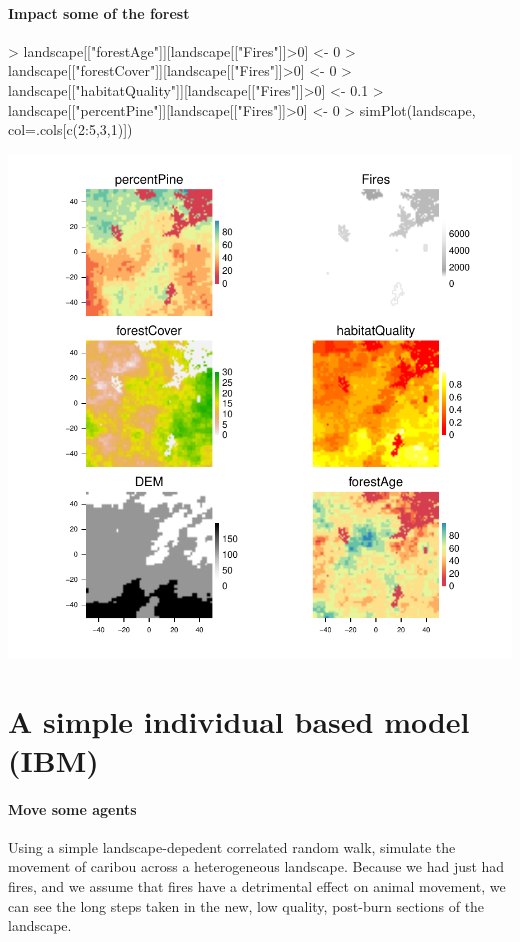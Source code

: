 \documentclass{article}
\begin{document}
\paragraph{Impact some of the forest}
\begin{Schunk}
\begin{Sinput}
> landscape[["forestAge"]][landscape[["Fires"]]>0] <- 0
> landscape[["forestCover"]][landscape[["Fires"]]>0] <- 0
> landscape[["habitatQuality"]][landscape[["Fires"]]>0] <- 0.1
> landscape[["percentPine"]][landscape[["Fires"]]>0] <- 0
> simPlot(landscape, col=.cols[c(2:5,3,1)])
\end{Sinput}
\end{Schunk}
\includegraphics{introduction-fire-impacts-maps}

\section{A simple individual based model (IBM)}
\paragraph{Move some agents}
Using a simple landscape-depedent correlated random walk, simulate the movement of caribou across a heterogeneous landscape. Because we had just had fires, and we assume that fires have a detrimental effect on animal movement, we can see the long steps taken in the new, low quality, post-burn sections of the landscape.
\end{document}
